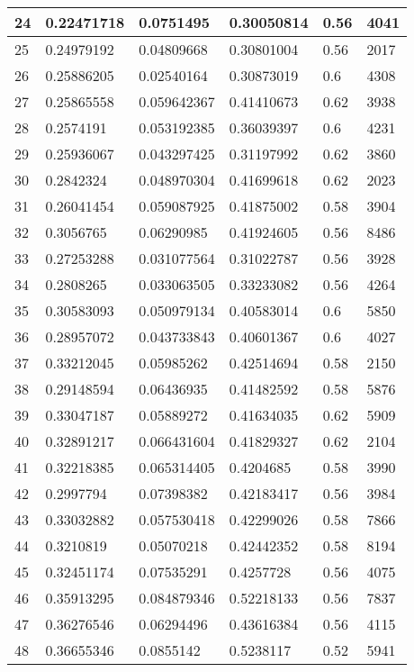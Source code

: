 \begin{longtable}{|l|l|l|l|l|l|}
24 & 0.22471718 & 0.0751495 & 0.30050814 & 0.56 & 4041 \\ \hline 
25 & 0.24979192 & 0.04809668 & 0.30801004 & 0.56 & 2017 \\ \hline 
26 & 0.25886205 & 0.02540164 & 0.30873019 & 0.6 & 4308 \\ \hline 
27 & 0.25865558 & 0.059642367 & 0.41410673 & 0.62 & 3938 \\ \hline 
28 & 0.2574191 & 0.053192385 & 0.36039397 & 0.6 & 4231 \\ \hline 
29 & 0.25936067 & 0.043297425 & 0.31197992 & 0.62 & 3860 \\ \hline 
30 & 0.2842324 & 0.048970304 & 0.41699618 & 0.62 & 2023 \\ \hline 
31 & 0.26041454 & 0.059087925 & 0.41875002 & 0.58 & 3904 \\ \hline 
32 & 0.3056765 & 0.06290985 & 0.41924605 & 0.56 & 8486 \\ \hline 
33 & 0.27253288 & 0.031077564 & 0.31022787 & 0.56 & 3928 \\ \hline 
34 & 0.2808265 & 0.033063505 & 0.33233082 & 0.56 & 4264 \\ \hline 
35 & 0.30583093 & 0.050979134 & 0.40583014 & 0.6 & 5850 \\ \hline 
36 & 0.28957072 & 0.043733843 & 0.40601367 & 0.6 & 4027 \\ \hline 
37 & 0.33212045 & 0.05985262 & 0.42514694 & 0.58 & 2150 \\ \hline 
38 & 0.29148594 & 0.06436935 & 0.41482592 & 0.58 & 5876 \\ \hline 
39 & 0.33047187 & 0.05889272 & 0.41634035 & 0.62 & 5909 \\ \hline 
40 & 0.32891217 & 0.066431604 & 0.41829327 & 0.62 & 2104 \\ \hline 
41 & 0.32218385 & 0.065314405 & 0.4204685 & 0.58 & 3990 \\ \hline 
42 & 0.2997794 & 0.07398382 & 0.42183417 & 0.56 & 3984 \\ \hline 
43 & 0.33032882 & 0.057530418 & 0.42299026 & 0.58 & 7866 \\ \hline 
44 & 0.3210819 & 0.05070218 & 0.42442352 & 0.58 & 8194 \\ \hline 
45 & 0.32451174 & 0.07535291 & 0.4257728 & 0.56 & 4075 \\ \hline 
46 & 0.35913295 & 0.084879346 & 0.52218133 & 0.56 & 7837 \\ \hline 
47 & 0.36276546 & 0.06294496 & 0.43616384 & 0.56 & 4115 \\ \hline 
48 & 0.36655346 & 0.0855142 & 0.5238117 & 0.52 & 5941 \\ \hline 

\end{longtable}
